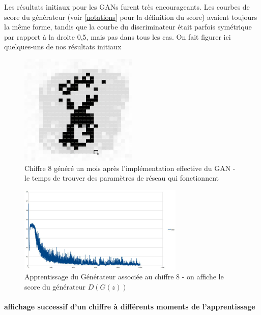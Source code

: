 Les résultats initiaux pour les GANs furent très encourageants. Les courbes de score du générateur (voir \ref{notations} pour la définition du score) avaient toujours la même forme, tandis que la courbe du discriminateur était parfois symétrique par rapport à la droite 0,5, mais pas dans tous les cas. On fait figurer ici quelques-uns de nos résultats initiaux
\begin{figure}[h!]
\begin{center}
\includegraphics[width=0.5\textwidth]{images/18_01_12-GAN/image.png}\caption{Chiffre 8 généré un mois après l'implémentation effective du GAN - le temps de trouver des paramètres de réseau qui fonctionnent}
\end{center}
\end{figure}

\begin{figure}[h!]
\begin{center}
\includegraphics[width=0.7\textwidth]{images/18_01_12-GAN/courbe.png}\caption{Apprentissage du Générateur associée au chiffre 8 - on affiche le score du générateur $D(G(z))$}
\end{center}
\end{figure}

\paragraph{affichage successif d'un chiffre à différents moments de l'apprentissage}

